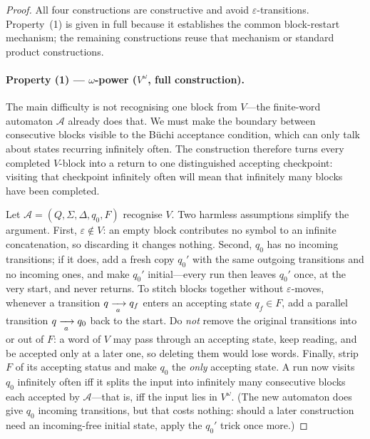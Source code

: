 \begin{proof}
All four constructions are constructive and avoid $\varepsilon$-transitions.
Property~(1) is given in full because it establishes the common
block-restart mechanism; the remaining constructions reuse that mechanism
or standard product constructions.

\paragraph{Property (1) --- $\omega$-power ($V^\omega$, full construction).}
The main difficulty is not recognising one block from $V$---the
finite-word automaton $\mathcal{A}$ already does that.  We must make the
boundary between consecutive blocks visible to the B\"uchi acceptance
condition, which can only talk about states recurring infinitely often.
The construction therefore turns every completed $V$-block into a return
to one distinguished accepting checkpoint: visiting that checkpoint
infinitely often will mean that infinitely many blocks have been
completed.

Let $\mathcal{A}=(Q,\Sigma,\Delta,q_0,F)$ recognise $V$.  Two harmless
assumptions simplify the argument.  First, $\varepsilon\notin V$: an
empty block contributes no symbol to an infinite concatenation, so
discarding it changes nothing.  Second, $q_0$ has no incoming
transitions; if it does, add a fresh copy $q_0'$ with the same outgoing
transitions and no incoming ones, and make $q_0'$ initial---every run
then leaves $q_0'$ once, at the very start, and never returns.
To stitch blocks together without $\varepsilon$-moves, whenever a
transition $q\xrightarrow[{\;a\;}]{}q_f$ enters an accepting state $q_f\in F$, add a
parallel transition $q\xrightarrow[{\;a\;}]{}q_0$ back to the start.  Do
\emph{not} remove the original transitions into or out of $F$: a word of
$V$ may pass through an accepting state, keep reading, and be accepted only at
a later one, so deleting them would lose words.  Finally, strip $F$ of
its accepting status and make $q_0$ the \emph{only} accepting state.  A
run now visits $q_0$ infinitely often iff it splits the input into
infinitely many consecutive blocks each accepted by $\mathcal{A}$---that
is, iff the input lies in $V^\omega$.  (The new automaton does give
$q_0$ incoming transitions, but that costs nothing: should a later
construction need an incoming-free initial state, apply the $q_0'$ trick
once more.)


\end{proof}
